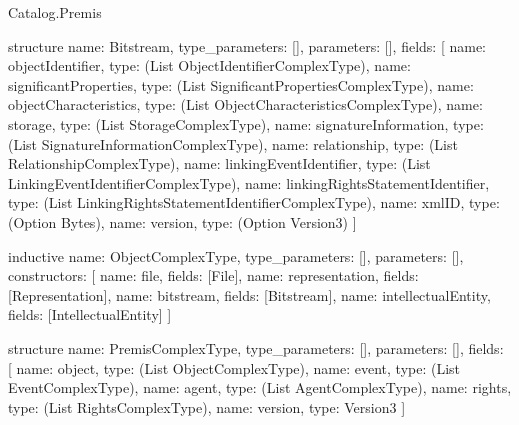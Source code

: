 \begin{lexlean}{Catalog.Premis}
\begin{semanticmodule}
structure{
  name: Bitstream,
  type_parameters: [],
  parameters: [],
  fields: [
    {name: objectIdentifier, type: (List ObjectIdentifierComplexType)},
    {name: significantProperties, type: (List SignificantPropertiesComplexType)},
    {name: objectCharacteristics, type: (List ObjectCharacteristicsComplexType)},
    {name: storage, type: (List StorageComplexType)},
    {name: signatureInformation, type: (List SignatureInformationComplexType)},
    {name: relationship, type: (List RelationshipComplexType)},
    {name: linkingEventIdentifier, type: (List LinkingEventIdentifierComplexType)},
    {name: linkingRightsStatementIdentifier, type: (List LinkingRightsStatementIdentifierComplexType)},
    {name: xmlID, type: (Option Bytes)},
    {name: version, type: (Option Version3)}
  ]
}

inductive{
  name: ObjectComplexType,
  type_parameters: [],
  parameters: [],
  constructors: [
    {name: file, fields: [File]},
    {name: representation, fields: [Representation]},
    {name: bitstream, fields: [Bitstream]},
    {name: intellectualEntity, fields: [IntellectualEntity]}
  ]
}

structure{
  name: PremisComplexType,
  type_parameters: [],
  parameters: [],
  fields: [
    {name: object, type: (List ObjectComplexType)},
    {name: event, type: (List EventComplexType)},
    {name: agent, type: (List AgentComplexType)},
    {name: rights, type: (List RightsComplexType)},
    {name: version, type: Version3}
  ]
}
\end{semanticmodule}
\end{lexlean}
